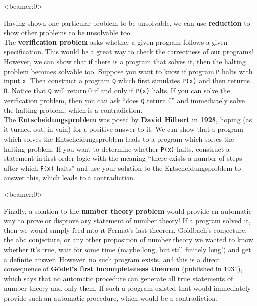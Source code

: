 \documentclass[handout, 12pt]{beamer}
\begin{document}
\begin{frame}<beamer:0>

\footnotesize
Having shown one particular problem to be unsolvable, we can use \textbf{reduction} to show other problems to be unsolvable too.
\\[0.6em]
The \textbf{verification problem} asks whether a given program follows a given specification. This would be a great way to check the correctness of our programs! However, we can show that if there is a program that solves it, then the halting problem becomes solvable too. Suppose you want to know if program \texttt{P} halts with input \texttt{x}. Then construct a program \texttt{Q} which first simulates \texttt{P(x)} and then returns $0$. Notice that \texttt{Q} will return $0$ if and only if \texttt{P(x)} halts. If you can solve the verification problem, then you can ask ``does \texttt{Q} return $0$'' and immediately solve the halting problem, which is a contradiction.
\\[0.6em]
The \textbf{Entscheidungsproblem} was posed by \textbf{David Hilbert} in \textbf{1928}, hoping (as it turned out, in vain) for a positive answer to it. We can show that a program which solves the Entscheidungsproblem leads to a program which solves the halting problem. If you want to determine whether \texttt{P(x)} halts, construct a statement in first-order logic with the meaning ``there exists a number of steps after which \texttt{P(x)} halts'' and use your solution to the Entscheidungsproblem to answer this, which leads to a contradiction.

\end{frame}

\begin{frame}<beamer:0>

\footnotesize
Finally, a solution to the \textbf{number theory problem} would provide an automatic way to prove or disprove any statement of number theory! If a program solved it, then we would simply feed into it Fermat's last theorem, Goldbach's conjecture, the abc conjecture, or any other proposition of number theory we wanted to know whether it's true, wait for some time (maybe long, but still finitely long!) and get a definite answer. However, no such program exists, and this is a direct consequence of \textbf{G\"{o}del's first incompleteness theorem} (published in 1931), which says that no automatic procedure can generate all true statements of number theory and only them. If such a program existed that would immediately provide such an automatic procedure, which would be a contradiction.

\end{frame}
\end{document}
